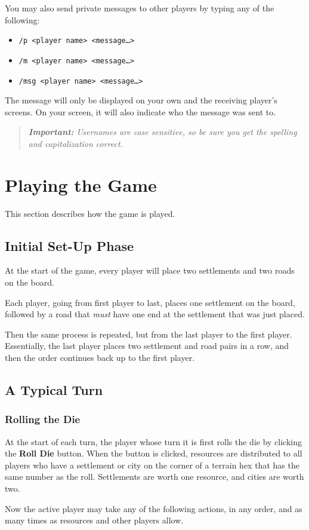 \documentclass[12pt,letterpaper,titlepage]{article}
\newcommand\note[1]{\begin{quote}\emph{\textbf{Important:} #1}\end{quote}}
\begin{document}
	You may also send private messages to other players by typing any of the following:
	\begin{itemize}
	\item \texttt{/p <player name> <message…>}
	\item \texttt{/m <player name> <message…>}
	\item \texttt{/msg <player name> <message…>}
	\end{itemize}
	The message will only be displayed on your own and the receiving player's screens. On your screen, it will also indicate who the message was sent to.
	
	\note{Usernames are case sensitive, so be sure you get the spelling and capitalization correct.}

\section{Playing the Game}
This section describes how the game is played.
	\subsection{Initial Set-Up Phase}
	At the start of the game, every player will place two settlements and two roads on the board.
	
	Each player, going from first player to last, places one settlement on the board, followed by a road that \emph{must} have one end at the settlement that was just placed.
	
	Then the same process is repeated, but from the last player to the first player. Essentially, the last player places two settlement and road pairs in a row, and then the order continues back up to the first player.
	
	\subsection{A Typical Turn}
		\subsubsection{Rolling the Die}
		At the start of each turn, the player whose turn it is first rolls the die by clicking the \textbf{Roll Die} button. When the button is clicked, resources are distributed to all players who have a settlement or city on the corner of a terrain hex that has the same number as the roll. Settlements are worth one resource, and cities are worth two.
		
		Now the active player may take any of the following actions, in any order, and as many times as resources and other players allow.
		\newpage
\end{document}
